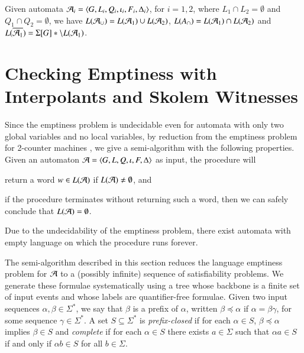 \documentclass{llncs}
\begin{document}
\begin{lemma}\label{lemma:boolean-closure}
  Given automata $\mathcal{A}_i = \langle G,L_i,Q_i,\iota_i,F_i,\Delta_i \rangle$, for
  $i=1,2$, where $L_1 \cap L_2 = \emptyset$ and $Q_1 \cap Q_2 =
  \emptyset$, we have $L(\mathcal{A}_\cup) = L(\mathcal{A}_1) \cup L(\mathcal{A}_2)$, $L(A_\cap)
  = L(\mathcal{A}_1) \cap L(\mathcal{A}_2)$ and $L(\overline{\mathcal{A}_1}) = \Sigma[G]*
  \setminus L(\mathcal{A}_1)$. 
\end{lemma}

\section{Checking Emptiness with Interpolants and Skolem Witnesses}

Since the emptiness problem is undecidable even for automata with only
two global variables and no local variables, by reduction from the
emptiness problem for 2-counter machines \cite{Minsky67}, we give a
semi-algorithm with the following properties. Given an automaton $\mathcal{A} =
\langle G,L,Q,\iota,F,\Delta \rangle$ as input, the procedure
will\begin{inparaenum}[(1)]
\item return a word $w \in L(\mathcal{A})$ if $L(\mathcal{A}) \neq \emptyset$, and
%
\item if the procedure terminates without returning such a word, then
  we can safely conclude that $L(\mathcal{A}) = \emptyset$. \end{inparaenum}
Due to the undecidability of the emptiness problem, there exist
automata with empty language on which the procedure runs forever.

The semi-algorithm described in this section reduces the language
emptiness problem for $\mathcal{A}$ to a (possibly infinite) sequence of
satisfiability problems. We generate these formulae systematically
using a tree whose backbone is a finite set of input events and whose
labels are quantifier-free formulae. Given two input sequences
$\alpha,\beta \in \Sigma^*$, we say that $\beta$ is a prefix of
$\alpha$, written $\beta \preceq \alpha$ if $\alpha = \beta \gamma$,
for some sequence $\gamma \in \Sigma^*$. A set $S \subseteq \Sigma^*$
is \emph{prefix-closed} if for each $\alpha \in S$, $\beta \preceq
\alpha$ implies $\beta \in S$ and \emph{complete} if for each $\alpha
\in S$ there exists $a \in \Sigma$ such that $\alpha a \in S$ if and
only if $\alpha b \in S$ for all $b \in \Sigma$. 
\end{document}

